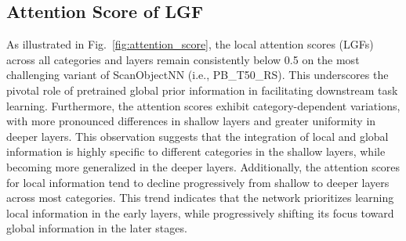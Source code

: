 \subsection{Attention Score of LGF}  
As illustrated in Fig.~\ref{fig:attention_score}, the local attention scores (LGFs) across all categories and layers remain consistently below 0.5 on the most challenging variant of ScanObjectNN (i.e., PB\_T50\_RS). This underscores the pivotal role of pretrained global prior information in facilitating downstream task learning. Furthermore, the attention scores exhibit category-dependent variations, with more pronounced differences in shallow layers and greater uniformity in deeper layers. This observation suggests that the integration of local and global information is highly specific to different categories in the shallow layers, while becoming more generalized in the deeper layers. Additionally, the attention scores for local information tend to decline progressively from shallow to deeper layers across most categories. This trend indicates that the network prioritizes learning local information in the early layers, while progressively shifting its focus toward global information in the later stages.



